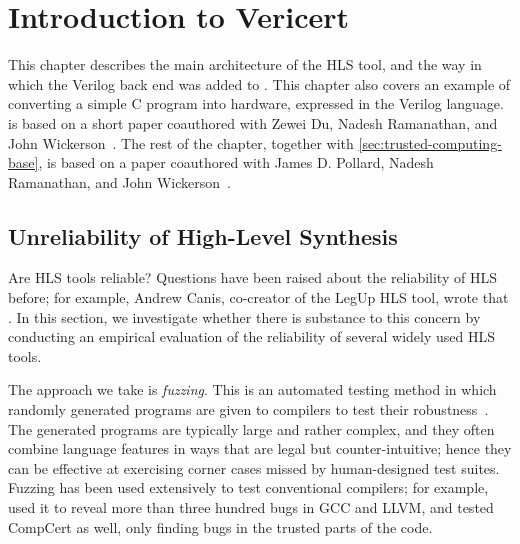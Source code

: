 \chapter{Introduction to Vericert}%
\label{sec:introduction-to-vericert}

\begin{chapsummary}
  This chapter describes the main architecture of the HLS tool, and the way in
  which the Verilog back end was added to \compcert{}.  This chapter also covers
  an example of converting a simple C program into hardware, expressed in the
  Verilog language.   is based on a short paper
  coauthored with Zewei Du, Nadesh Ramanathan, and John
  Wickerson~\cite{herklotz21_esrhlst}.  The rest of the chapter, together with
  \cref{sec:trusted-computing-base}, is based on a paper coauthored with James
  D. Pollard, Nadesh Ramanathan, and John Wickerson~\cite{herklotz21_fvhls}.
\end{chapsummary}

\section{Unreliability of High-Level Synthesis}%
\label{sec:itv:unreliability-hls}

Are \gls{HLS} tools reliable? Questions have been raised about the reliability
of HLS before; for example, Andrew Canis, co-creator of the LegUp HLS tool,
wrote that .  In this section, we
investigate whether there is substance to this concern by conducting an
empirical evaluation of the reliability of several widely used HLS tools.

The approach we take is \emph{fuzzing}.  This is an automated testing method in
which randomly generated programs are given to compilers to test their
robustness~\cite{chen13_tcf, sun16_tucbgl, liang18_f, zhang19_fubsmc,
  yang11_findin_under_bugs_c_compil, lidbury15_many_core_compil_fuzzin}.  The
generated programs are typically large and rather complex, and they often
combine language features in ways that are legal but counter-intuitive; hence
they can be effective at exercising corner cases missed by human-designed test
suites.  Fuzzing has been used extensively to test conventional compilers; for
example, \textcite{yang11_findin_under_bugs_c_compil} used it to reveal more
than three hundred bugs in GCC and LLVM, and tested CompCert as well, only
finding bugs in the trusted parts of the code.

